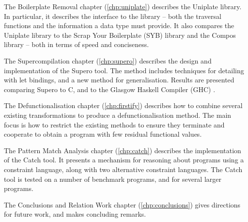 The Boilerplate Removal chapter (\ref{chp:uniplate}) describes the Uniplate library. In particular, it describes the interface to the library -- both the traversal functions and the information a data type must provide. It also compares the Uniplate library to the Scrap Your Boilerplate (SYB) library \cite{lammel:syb} and the Compos library \cite{bringert:compos} -- both in terms of speed and conciseness.

The Supercompilation chapter (\ref{chp:supero}) describes the design and implementation of the Supero tool. The method includes techniques for detailing with let bindings, and a new method for generalisation. Results are presented comparing Supero to C, and to the Glasgow Haskell Compiler (GHC) \cite{ghc}.

The Defunctionalisation chapter (\ref{chp:firstify}) describes how to combine several existing transformations to produce a defunctionalisation method. The main focus is how to restrict the existing methods to ensure they terminate and cooperate to obtain a program with few residual functional values.

The Pattern Match Analysis chapter (\ref{chp:catch}) describes the implementation of the Catch tool. It presents a mechanism for reasoning about programs using a constraint language, along with two alternative constraint languages. The Catch tool is tested on a number of benchmark programs, and for several larger programs.

The Conclusions and Relation Work chapter (\ref{chp:conclusions}) gives directions for future work, and makes concluding remarks.

